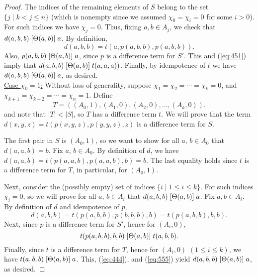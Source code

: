 \begin{proof}
The indices of the remaining elements of $S$
belong to the set $\{j \mid k<j\leq n\}$ (which is nonempty since we
assumed $\chi_0 = \chi_i = 0$ for some $i>0$).
For such indices we have $\chi_j = 0$.
Thus, fixing $a, b \in A_j$, we check that
$d(a,b,b)\mathrel{[\Theta(a,b)]} a$.
By definition,
\begin{equation}
  \label{eq:451}
d(a,b,b) =t(a, p(a,b,b), p(a,b,b)).  
\end{equation}
Also, $p(a,b,b) \mathrel{[\Theta(a,b)]} a$,
since $p$ is a \glocal difference term for $S'$.
This and (\ref{eq:451}) imply
that
$d(a, b,b) \mathrel{[\Theta(a,b)]} t(a,a,a))$.
Finally, by idempotence of $t$ we have
$d(a,b,b)\mathrel{[\Theta(a,b)]} a$,
as desired.
\\[4pt]
\underline{Case $\chi_0 = 1$:}
Without loss of generality, suppose $\chi_1 = \chi_2 =\cdots =\chi_k = 0$,
and $\chi_{k+1} = \chi_{k+2} = \cdots = \chi_{n} = 1$.
Define
\[
T = ((A_0, 1), (A_1, 0), (A_2, 0), \dots, (A_k, 0)).
\]
and note that $|T| < |S|$, so $T$ has a \glocal difference term $t$.
We will prove that the term $d(x,y,z) = t(p(x,y,z), p(y,y,z), z)$
is a \glocal difference term for $S$.

The first pair in $S$ is $(A_0, 1)$, so we want to show for all $a$, $b \in A_0$ that
$d(a,a,b) = b$.
Fix $a$, $b \in A_0$. By definition of $d$,
we have $d(a,a,b) = t(p(a,a,b), p(a,a,b), b) =b$.
The last equality holds since $t$ is a \glocal difference term for $T$, in particular,
for $(A_0, 1)$.

Next, consider the (possibly empty) set of indices $\{i \mid 1\leq i \leq k\}$.
For such indices $\chi_i =0$, so we will prove
for all $a$, $b \in A_i$ that
$d(a,b,b) \mathrel{[\Theta(a,b)]} a$.
Fix $a, b\in A_i$.
By definition of $d$ and idempotence of $p$, 
\begin{equation}
\label{eq:444}  
  d(a,b,b) = t(p(a,b,b), p(b,b,b), b) =t(p(a,b,b), b, b).
\end{equation}
Next, since $p$ is a \glocal difference term for $S'$,
hence for $(A_i, 0)$,
\begin{equation}
  \label{eq:555}
  t(p(a,b,b), b, b)
 \Comr{\Cg(a,b)}
 t(a, b, b).
\end{equation}
Finally, since $t$ is a \glocal difference term for $T$, hence for
$(A_i, 0)$  $(1\leq i \leq k)$, we have  %
$t(a, b, b) \mathrel{[\Theta(a,b)]} a$.
This, (\ref{eq:444}), and (\ref{eq:555}) yield
$d(a,b,b) \mathrel{[\Theta(a,b)]} a$,
as desired.


\end{proof}
